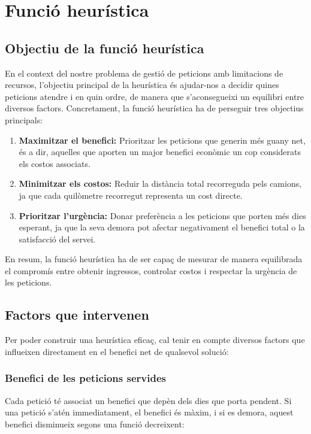 \section{Funció heurística}
\label{sec:heuristic}

\subsection{Objectiu de la funció heurística}

En el context del nostre problema de gestió de peticions amb limitacions de recursos, l'objectiu principal de la heurística és ajudar-nos a decidir quines peticions atendre i en quin ordre, de manera que s’aconsegueixi un equilibri entre diversos factors. Concretament, la funció heurística ha de perseguir tres objectius principals:

\begin{enumerate}
\item \textbf{Maximitzar el benefici:} Prioritzar les peticions que generin més guany net, és a dir, aquelles que aporten un major benefici econòmic un cop considerats els costos associats.
\item \textbf{Minimitzar els costos:} Reduir la distància total recorreguda pels camions, ja que cada quilòmetre recorregut representa un cost directe.
\item \textbf{Prioritzar l'urgència:} Donar preferència a les peticions que porten més dies esperant, ja que la seva demora pot afectar negativament el benefici total o la satisfacció del servei.
\end{enumerate}

En resum, la funció heurística ha de ser capaç de mesurar de manera equilibrada el compromís entre obtenir ingressos, controlar costos i respectar la urgència de les peticions.

\subsection{Factors que intervenen}

Per poder construir una heurística eficaç, cal tenir en compte diversos factors que influeixen directament en el benefici net de qualsevol solució:

\subsubsection{Benefici de les peticions servides}

Cada petició té associat un benefici que depèn dels dies que porta pendent. Si una petició s’atén immediatament, el benefici és màxim, i si es demora, aquest benefici disminueix segons una funció decreixent:

